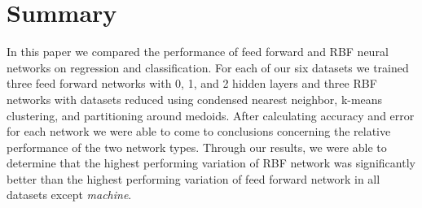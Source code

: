 \section{Summary}\label{sec:summary}
In this paper we compared the performance of feed forward and RBF neural networks on regression and classification.
For each of our six datasets we trained three feed forward networks with 0, 1, and 2 hidden layers and three RBF networks with datasets reduced using condensed nearest neighbor, k-means clustering, and partitioning around medoids.
After calculating accuracy and error for each network we were able to come to conclusions concerning the relative performance of the two network types. 
Through our results, we were able to determine that the highest performing variation of RBF network was significantly better than the highest performing variation of feed forward network in all datasets except \textit{machine}.